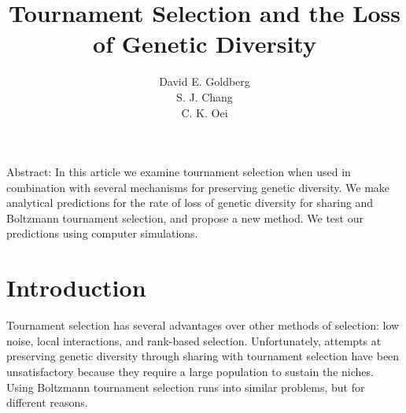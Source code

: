 
\title{Tournament Selection and the Loss of Genetic Diversity}
\author{David E. Goldberg\\S. J. Chang\\C. K. Oei}

\maketitle


{\noindent\narrower
Abstract:
In this article we examine tournament selection when used in combination with
several
mechanisms for preserving genetic diversity.  We make analytical predictions
for the rate of loss of genetic diversity for sharing and Boltzmann tournament
selection, and propose a new method.  We test our predictions using computer
simulations.
}

\section{Introduction}
Tournament selection has several advantages over other methods of selection:
low noise, local interactions, and rank-based selection\cite{selection}.
Unfortunately,
attempts at preserving genetic diversity through sharing\cite{niche}
with tournament
selection have been unsatisfactory because they require a large population to
sustain the niches.  Using Boltzmann tournament selection\cite{notebolz}
 runs into
similar problems, but for different reasons.

